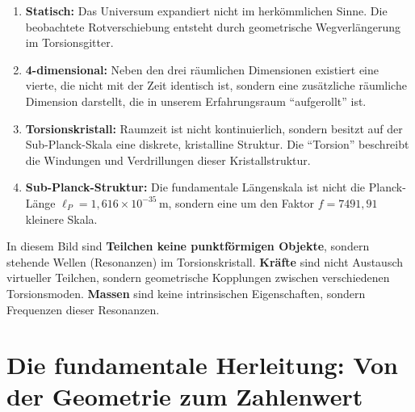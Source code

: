 	\begin{enumerate}
		\item \textbf{Statisch:} Das Universum expandiert nicht im herkömmlichen Sinne. Die beobachtete Rotverschiebung entsteht durch geometrische Wegverlängerung im Torsionsgitter.
		\item \textbf{4-dimensional:} Neben den drei räumlichen Dimensionen existiert eine vierte, die nicht mit der Zeit identisch ist, sondern eine zusätzliche räumliche Dimension darstellt, die in unserem Erfahrungsraum \enquote{aufgerollt} ist.
		\item \textbf{Torsionskristall:} Raumzeit ist nicht kontinuierlich, sondern besitzt auf der Sub-Planck-Skala eine diskrete, kristalline Struktur. Die \enquote{Torsion} beschreibt die Windungen und Verdrillungen dieser Kristallstruktur.
		\item \textbf{Sub-Planck-Struktur:} Die fundamentale Längenskala ist nicht die Planck-Länge \(\ell_P = 1{,}616 \times 10^{-35}\,\text{m}\), sondern eine um den Faktor \(f = 7491{,}91\) kleinere Skala.
	\end{enumerate}
	
	In diesem Bild sind \textbf{Teilchen keine punktförmigen Objekte}, sondern stehende Wellen (Resonanzen) im Torsionskristall. \textbf{Kräfte} sind nicht Austausch virtueller Teilchen, sondern geometrische Kopplungen zwischen verschiedenen Torsionsmoden. \textbf{Massen} sind keine intrinsischen Eigenschaften, sondern Frequenzen dieser Resonanzen.
	
	\section{Die fundamentale Herleitung: Von der Geometrie zum Zahlenwert}
